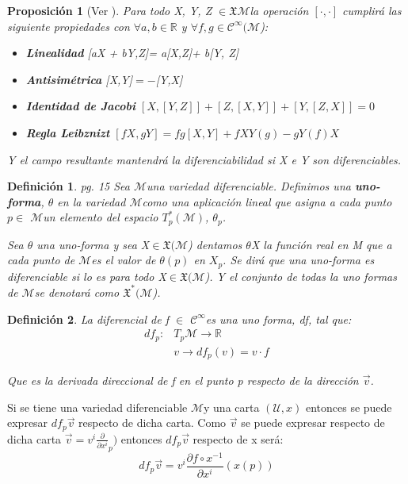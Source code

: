 \documentclass[pdftex,11pt,a4paper]{book}
\newtheorem{defi}{Definici\'on}
\newtheorem{propo}{Proposición}
\newcommand{\M}{$\mathscr{M}$}
\newcommand{\Cinf}{ $\mathscr{C}^\infty$}
\begin{document}
\begin{propo}[Ver \cite{gondinho}]
Para todo X, Y, Z $\in \mathfrak{X}$\M  la operación $[\cdot,\cdot]$ cumplirá las siguiente propiedades con $\forall a,b \in \mathbb{R}$ y $\forall f, g \in \mathcal{C}^\infty (\mathscr{M}$): 
\begin{itemize}
    \item \textbf{Linealidad} [aX + bY,Z]= a[X,Z]+ b[Y, Z]
    \item \textbf{Antisimétrica} [X,Y]$= -$[Y,X]
    \item \textbf{Identidad de Jacobi} $[X,[Y, Z]]+[Z,[X, Y]]+[Y,[Z, X]]=0$ 
    \item \textbf{Regla Leibznizt } $[fX, gY]= fg[X,Y] + fXY(g) - gY(f)X $
\end{itemize}
Y el campo resultante mantendrá la diferenciabilidad si X e Y son diferenciables. \cite{DoCarmoRiemann}
\end{propo}

\begin{defi}\cite{boothby} pg. 15
Sea \M una variedad diferenciable. Definimos una \textbf{uno-forma}, $\theta$ en la variedad \M como una aplicación lineal que asigna a cada punto $p \in$ \M un elemento del espacio $T_p^*(\mathscr{M})$, $\theta_p$. 

Sea $\theta$ una uno-forma y sea  X$ \in \mathfrak{X}($\M) dentamos $\theta$X  la función real en M que a cada punto de \M es el valor de $\theta(p)$ en $X_p$.
Se dirá que una uno-forma es diferenciable si lo es para todo X$ \in \mathfrak{X}($\M). Y el conjunto de todas la uno formas de \M se denotará como  $\mathfrak{X}^*($\M).    
\end{defi}

\begin{defi}
La diferencial de f  $\in$\Cinf es una uno forma, \textit{df}, tal que:
\begin{equation}
\begin{aligned}
            df_p : &T_p\mathcal{M} \to \mathbb{R}\\
        & v \to df_p(v)= v\cdot f
\end{aligned}
\end{equation}


Que es la derivada direccional de f en el punto p respecto de la dirección $\vec{v}$.\cite{boothby}
\end{defi}

Si se tiene una variedad diferenciable \M y una carta $(\mathcal{U}, x)$
entonces se puede expresar $df_p \vec{v}$ respecto de dicha carta. Como $\vec{v}$ se puede expresar respecto de dicha carta $\vec{v}=v^i\frac{\partial}{\partial x^i}_p) $ entonces $df_p \vec{v}$  respecto de x será: 
$$df_p \vec{v}=v^i\frac{\partial f \circ x^{-1}}{\partial x^i}(x(p)) $$
\end{document}
